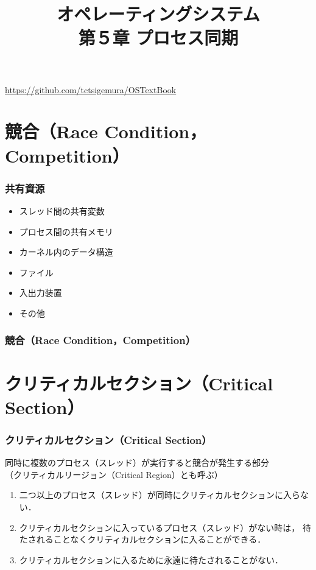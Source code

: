\documentclass[unicode]{beamer}                   %
\begin{document}
\title[プロセス同期]
      {オペレーティングシステム\\第５章 プロセス同期}
\date{}
\begin{frame}
  \titlepage
  \centerline{\url{https://github.com/tctsigemura/OSTextBook}}
\end{frame}


\section{競合（Race Condition，Competition）}
\begin{frame}
  \frametitle{共有資源}
  \begin{itemize}
    \item スレッド間の共有変数
    \item プロセス間の共有メモリ
    \item カーネル内のデータ構造
    \item ファイル
    \item 入出力装置
    \item その他
  \end{itemize}
\end{frame}

\begin{frame}
  \frametitle{競合（Race Condition，Competition）}
\end{frame}

\section{クリティカルセクション（Critical Section）}
\begin{frame}
  \frametitle{クリティカルセクション（Critical Section）}
  同時に複数のプロセス（スレッド）が実行すると競合が発生する部分\\
  （クリティカルリージョン（Critical Region）とも呼ぶ）
  \begin{enumerate}
  \item 二つ以上のプロセス（スレッド）が同時にクリティカルセクションに入らない．
  \item クリティカルセクションに入っているプロセス（スレッド）がない時は，
    待たされることなくクリティカルセクションに入ることができる．
  \item クリティカルセクションに入るために永遠に待たされることがない．
  \end{enumerate}
\end{frame}
\end{document}
